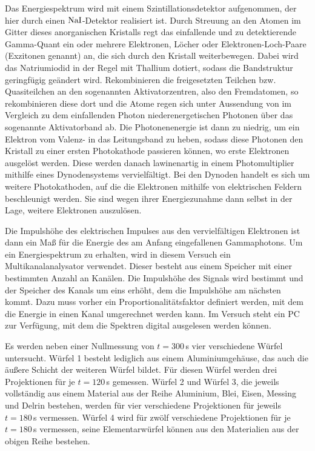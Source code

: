 Das Energiespektrum wird mit einem Szintillationsdetektor aufgenommen, der hier durch einen $\ce{NaI}$-Detektor realisiert ist. Durch Streuung an den Atomen im Gitter dieses anorganischen Kristalls regt das einfallende und zu detektierende Gamma-Quant ein oder mehrere Elektronen, Löcher oder Elektronen-Loch-Paare (Exzitonen genannt) an, die sich durch den Kristall weiterbewegen. Dabei wird das Natriumiodid in der Regel mit Thallium dotiert, sodass die Bandstruktur geringfügig geändert wird. Rekombinieren die freigesetzten Teilchen bzw. Quasiteilchen an den sogenannten Aktivatorzentren, also den Fremdatomen, so rekombinieren diese dort und die Atome regen sich unter Aussendung von im Vergleich zu dem einfallenden Photon niederenergetischen Photonen über das sogenannte Aktivatorband ab. Die Photonenenergie ist dann zu niedrig, um ein Elektron vom Valenz- in das Leitungsband zu heben, sodass diese Photonen den Kristall zu einer ersten Photokathode passieren können, wo erste Elektronen ausgelöst werden.
Diese werden danach lawinenartig in einem Photomultiplier mithilfe eines Dynodensystems vervielfältigt. Bei den Dynoden handelt es sich um weitere Photokathoden, auf die die Elektronen mithilfe von elektrischen Feldern beschleunigt werden. Sie sind wegen ihrer Energiezunahme dann selbst in der Lage, weitere Elektronen auszulösen.

Die Impulshöhe des elektrischen Impulses aus den vervielfältigen Elektronen ist dann ein Maß für die Energie des am Anfang eingefallenen Gammaphotons. Um ein Energiespektrum zu erhalten, wird in diesem Versuch ein Multikanalanalysator verwendet. Dieser besteht aus einem Speicher mit einer bestimmten Anzahl an Kanälen. Die Impulshöhe des Signals wird bestimmt und der Speicher des Kanals um eins erhöht, dem die Impulshöhe am nächsten kommt. Dazu muss vorher ein Proportionalitätsfaktor definiert werden, mit dem die Energie in einen Kanal umgerechnet werden kann.
Im Versuch steht ein PC zur Verfügung, mit dem die Spektren digital ausgelesen werden können.

Es werden neben einer Nullmessung von $t=300$\,s vier verschiedene Würfel untersucht. Würfel 1 besteht lediglich aus einem Aluminiumgehäuse, das auch die äußere Schicht der weiteren Würfel bildet. Für diesen Würfel werden drei Projektionen für je $t=120$\,s gemessen. Würfel 2 und Würfel 3, die jeweils vollständig aus einem Material aus der Reihe Aluminium, Blei, Eisen, Messing und Delrin bestehen, werden für vier verschiedene Projektionen für jeweils $t=180$\,s vermessen. Würfel 4 wird für zwölf verschiedene Projektionen für je $t=180$\,s vermessen, seine Elementarwürfel können aus den Materialien aus der obigen Reihe bestehen.
